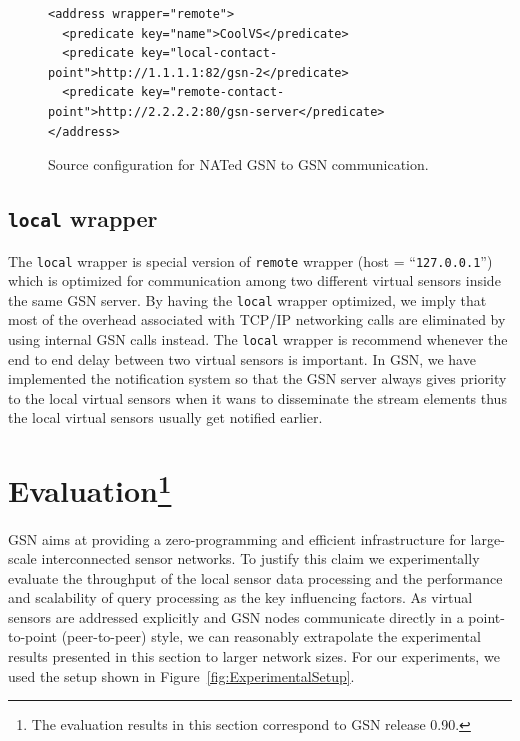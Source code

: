 \begin{figure}%
  \centering
  \lstset{numbers=left, numberstyle=\footnotesize,basicstyle=\small}
\begin{lstlisting}
<address wrapper="remote">
  <predicate key="name">CoolVS</predicate>
  <predicate key="local-contact-point">http://1.1.1.1:82/gsn-2</predicate>
  <predicate key="remote-contact-point">http://2.2.2.2:80/gsn-server</predicate>
</address>        
\end{lstlisting}
  \caption{Source configuration for NATed GSN to GSN communication.}
  \label{gsn2gsn-nat}
\end{figure}

\subsection{\texttt{local} wrapper}
The \verb|local| wrapper is special version of \texttt{remote} wrapper (host = ``\texttt{127.0.0.1}'') which is optimized
for communication among two different virtual sensors inside the same GSN server. By having the
\texttt{local} wrapper optimized, we imply that most of the overhead associated with TCP/IP networking
calls are eliminated by using internal GSN calls instead. The \texttt{local} wrapper is recommend whenever
the end to end delay between two virtual sensors is important. In GSN, we have implemented the 
notification system so that the GSN server always gives priority to the local virtual sensors when it wans to disseminate
the stream elements thus the local virtual sensors usually get notified earlier.



\section{Evaluation\footnote{The evaluation results in this section correspond to GSN release 0.90.}}
\label{sec:evaluation}

GSN aims at providing a zero-programming and efficient infrastructure for
large-scale interconnected sensor networks. To justify this claim we
experimentally evaluate the throughput of the local sensor data processing and
the performance and scalability of query processing as the key influencing
factors.  As virtual sensors are addressed explicitly and GSN nodes communicate
directly in a point-to-point (peer-to-peer) style, we can reasonably
extrapolate the experimental results presented in this section to larger
network sizes.  For our experiments, we used the setup shown in
Figure~\ref{fig:ExperimentalSetup}.

